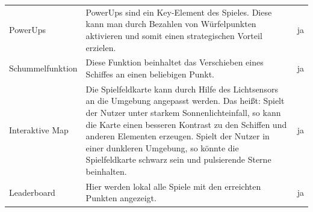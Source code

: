 \documentclass[11pt]{article} %
\begin{document}
\begin{table}[H]
\begin{tabular}{l|p{10cm}|l}
PowerUps           & PowerUps sind ein Key-Element des Spieles. Diese kann man durch Bezahlen von Würfelpunkten aktivieren und somit einen strategischen Vorteil erzielen.                                                                                                                                                                                                                      & ja \\
Schummelfunktion    & Diese Funktion beinhaltet das Verschieben eines Schiffes an einen beliebigen Punkt.                                                                                                                                                                                                                                                                                         & ja \\
Interaktive Map     & Die Spielfeldkarte kann durch Hilfe des Lichtsensors an die Umgebung angepasst werden. Das heißt: Spielt der Nutzer unter starkem Sonnenlichteinfall, so kann die Karte einen besseren Kontrast zu den Schiffen und anderen Elementen erzeugen. Spielt der Nutzer in einer dunkleren Umgebung, so könnte die Spielfeldkarte schwarz sein und pulsierende Sterne beinhalten. & ja \\
Leaderboard         & Hier werden lokal alle Spiele mit den erreichten Punkten angezeigt.                                                                                                                                                                                                                                                                                                         & ja
\end{tabular}
\end{table}
\end{document}
